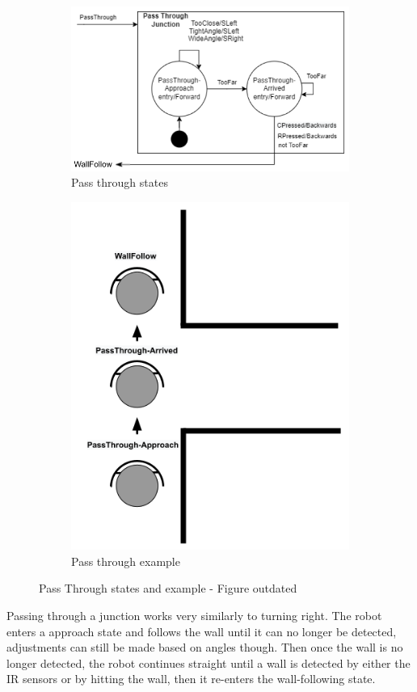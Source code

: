 \documentclass[12pt]{report}
\begin{document}
\begin{figure}[H]
  \begin{subfigure}[b]{0.6\textwidth}
    \includegraphics[width=\textwidth]{images/PassThroughStates.png}
    \caption{Pass through states}
    \label{fig:f3}
  \end{subfigure}
  \hfill
  \begin{subfigure}[b]{0.5\textwidth}
    \includegraphics[width=\textwidth]{images/Pass Through Example.png}
    \caption{Pass through example}
    \label{fig:f4}
  \end{subfigure}
  \caption{Pass Through states and example - Figure outdated}
\end{figure}
Passing through a junction works very similarly to turning right. The robot enters a approach state and follows the wall until it can no longer be detected, adjustments can still be made based on angles though. Then once the wall is no longer detected, the robot continues straight until a wall is detected by either the IR sensors or by hitting the wall, then it re-enters the wall-following state.
\end{document}
